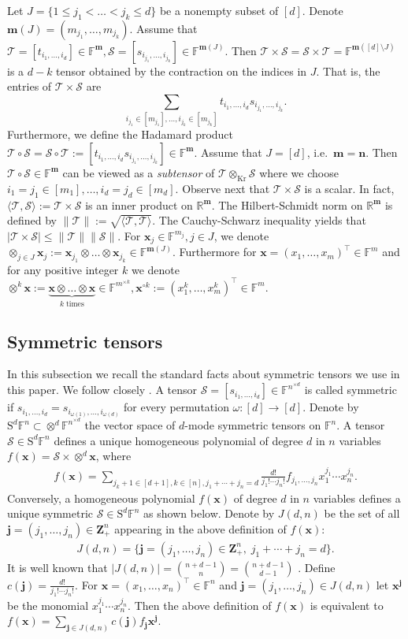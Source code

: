 \documentclass{amsart}
\newcommand{\F}{\mathbb{F}}
\newcommand{\R}{\mathbb{R}}
\newcommand{\Z}{\mathbf{Z}}
\newcommand{\m}{\mathbf{m}}
\newcommand{\n}{\mathbf{n}}
\newcommand{\x}{\mathbf{x}}
\newcommand{\0}{\mathbf{0}}
\newcommand{\1}{\mathbf{1}}
\newcommand{\bj}{\mathbf{j}}
\newcommand{\cS}{\mathcal{S}}
\newcommand{\cT}{\mathcal{T}}
\newcommand{\lan}{\langle}
\newcommand{\ran}{\rangle}
\newcommand{\an}[1]{\lan#1\ran}
\newcommand{\Kron}{\mathop{\mathrm{Kr}}\nolimits}
\newcommand{\trans}{^\top}
\newcommand{\rS}{\mathrm{S}}
\theoremstyle{remark}
\numberwithin{equation}{section} %
\renewcommand{\le}{\leqslant}
\begin{document}
 Let $J=\{1\le j_1<\ldots<j_k\le d\}$ be a nonempty subset of $[d]$.  Denote $\m(J)=(m_{j_1},\ldots,m_{j_k})$.
 Assume that $\cT=[t_{i_1,\ldots,i_d}]\in\F^\m,\cS=[s_{i_{j_1},\ldots,i_{j_k}}]\in\F^{\m(J)}$.
 Then $\cT\times \cS=\cS\times \cT=\F^{\m([d]\setminus J)}$ is a $d-k$ tensor obtained by the contraction on the indices
 in $J$.  That is, the entries of $\cT\times \cS$ are
 \[\sum_{i_{j_1}\in [m_{j_1}],\ldots, i_{j_k}\in[m_{j_k}]} t_{i_1,\ldots,i_d} s_{i_{j_1} ,\ldots,i_{j_k}}.\]
 Furthermore, we define the Hadamard product $\cT\circ \cS=\cS\circ\cT:=[t_{i_1,\ldots,i_d} s_{i_{j_1},\ldots,i_{j_k}}]\in \F^\m$.
 Assume that $J=[d]$, i.e.\ $\m=\n$.  Then $\cT\circ \cS\in\F^{\m}$ can be viewed as a \emph{subtensor} of $\cT\otimes_{\Kron}\cS$
 where we choose $i_1=j_1\in [m_1],\ldots,i_d=j_d\in [m_d]$.
 Observe next that $\cT\times\cS$ is a scalar.  In fact, $\an{\cT,\cS}:=\cT\times \cS$ is an inner product on $\R^\m$.
%
The Hilbert-Schmidt norm on $\R^\m$ is defined by
 $\|\cT\|:=\sqrt{\an{\cT,\cT}}$.  The Cauchy-Schwarz inequality yields that $|\cT\times \cS|\le \|\cT\| \|\cS\|$.
%
 For $\x_j\in \F^{m_j}, j\in J$, we denote $\otimes_{j\in J} \x_j:=\x_{j_1}\otimes\dots\otimes \x_{j_k}\in \F^{\m(J)}$.
 Furthermore for $\x=(x_1,\ldots,x_m)\trans\in \F^m$ and for any positive integer $k$ we denote $\otimes^k {\x}:=\underbrace{{\x}\otimes\dots\otimes{\x}}_{k\;\text{times}}\in \F^{m^{\times k}}, \x^{\circ k}:=(x_1^k,\ldots,x_m^k)\trans\in \F^m$.
\subsection{Symmetric tensors}\label{subsec:symten}
 In this subsection we recall the standard facts about symmetric tensors we use in this paper.  We follow closely \cite{FW16}.  A tensor $\cS=[s_{i_1,\ldots,i_d}]\in\F^{n^{\times d}}$ is called symmetric  if $s_{i_1,\ldots,i_d}=
s_{i_{\omega(1)},\ldots,i_{\omega(d)}}$ for every permutation $\omega:[d]\to[d]$.  
Denote by $\rS^d\F^n\subset \otimes^d\F^{n^{\times d}}$ the vector space of $d$-mode symmetric tensors on $\F^n$.  A tensor
$\cS\in\rS^d\F^n$ defines a unique homogeneous polynomial of degree $d$ in $n$ variables $f(\x)=\cS\times\otimes^d\x$, where
\begin{eqnarray*}\label{defpolfx}
f(\x)=\sum_{ j_k+1\in [d+1],k\in[n], j_1+\cdots +j_n=d} \frac{d!}{j_1!\cdots j_n!} f_{j_1,\ldots,j_n} x_1^{j_1}\cdots x_n^{j_n}.
\end{eqnarray*}
Conversely, a homogeneous polynomial $f(\x)$ of degree $d$ in $n$ variables defines a unique symmetric $\cS\in\rS^d\F^n$ as shown below.
 Denote by $J(d,n)$ be the set of all $\bj=(j_1,\ldots,j_n)\in\Z_+^n$ appearing in the above definition of $f(\x)$:
\begin{eqnarray*}\label{defJdn} 
J(d,n)= \{\bj=(j_1,\ldots,j_n)\in\Z_+^n,\; j_1+\cdots+j_n=d\}.
\end{eqnarray*}
It is well known that $|J(d,n)|={n+d-1\choose n}={n+d-1\choose d-1}$ \cite{FW16}.
Define $c(\bj)=\frac{d!}{j_1!\cdots j_n!}$.
For $\x=(x_1,\ldots,x_n)\trans\in\F^n$ and $\bj=(j_1,\ldots,j_n)\in J(d,n)$ let $\x^{\bj}$ be the monomial $x_1^{j_1}\cdots x_n^{j_n}$.  Then the above definition of $f(\x)$  is equivalent to $f(\x)=\sum_{\bj\in J(d,n)} c(\bj)f_{\bj}\x^{\bj}$.
\end{document}
